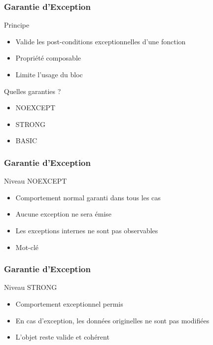 \documentclass[svgnames]{beamer}
\begin{document}
\frame
{
  \frametitle{Garantie d'Exception}
  \begin{block}{Principe}
  \begin{itemize}
  \item Valide les \alert{post-conditions exceptionnelles} d'une fonction
  \item Propriété composable
  \item Limite l'usage du bloc 
  \end{itemize}
  \end{block}

  \begin{block}{Quelles garanties ?}
  \begin{itemize}
  \item NOEXCEPT
  \item STRONG
  \item BASIC
  \end{itemize}
  \end{block}
}


\frame
{
  \frametitle{Garantie d'Exception}
  \begin{block}{Niveau NOEXCEPT}
  \begin{itemize}
  \item Comportement normal garanti dans tous les cas
  \item Aucune exception ne sera émise
  \item Les exceptions internes ne sont pas observables
  \item Mot-clé 
  \end{itemize}
  \end{block}

  \begin{overlayarea}{\textwidth}{3cm}
  \end{overlayarea}
}

\frame
{
  \frametitle{Garantie d'Exception}
  \begin{block}{Niveau STRONG}
  \begin{itemize}
  \item Comportement exceptionnel permis
  \item En cas d'exception, les données originelles ne sont pas modifiées
  \item L'objet reste valide et cohérent
  \end{itemize}
  \end{block}
}
\end{document}
